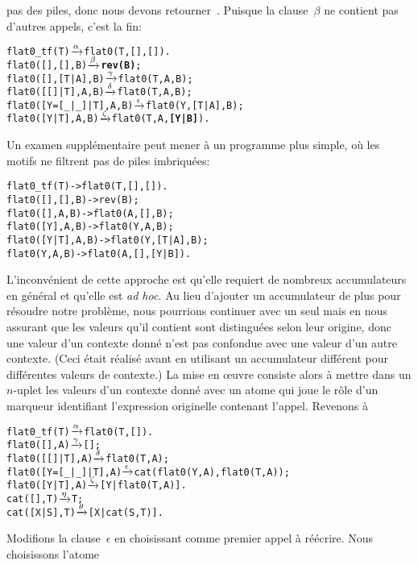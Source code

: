 pas des piles, donc nous devons retourner~. Puisque la
clause~\(\beta\) ne contient pas d'autres appels, c'est la fin:
\begin{alltt}
flat0_tf(T)                \(\smashedrightarrow{\alpha}\) flat0(T,[],[]).
flat0(         [],   [],B) \(\smashedrightarrow{\beta}\) \textbf{rev(B)};
flat0(         [],[T|A],B) \(\smashedrightarrow{\gamma}\) flat0(T,A,B);
flat0(     [[]|T],    A,B) \(\smashedrightarrow{\delta}\) flat0(T,A,B);
flat0([Y=[\_|\_]|T],    A,B) \(\smashedrightarrow{\epsilon}\) flat0(Y,[T|A],B);
flat0(      [Y|T],    A,B) \(\smashedrightarrow{\zeta}\) flat0(T,A,\textbf{[Y|B]}).
\end{alltt}
Un examen supplémentaire peut mener à un programme plus simple, où les
motifs ne filtrent pas de piles imbriquées:
\begin{alltt}
flat0_tf(T)       -> flat0(T,[],[]).
flat0(   [],[],B) -> rev(B);
flat0(   [], A,B) -> flat0(A,   [],    B);
flat0(  [Y], A,B) -> flat0(Y,    A,    B);\hfill% \emph{Optimisation}
flat0([Y|T], A,B) -> flat0(Y,[T|A],    B);
flat0(    Y, A,B) -> flat0(A,   [],[Y|B]).
\end{alltt}
L'inconvénient de cette approche est qu'elle requiert de nombreux
accumulateurs en général et qu'elle est \emph{ad hoc}. Au lieu
d'ajouter un accumulateur de plus pour résoudre notre problème, nous
pourrions continuer avec un seul mais en nous assurant que les valeurs
qu'il contient sont distinguées selon leur origine, donc une valeur
d'un contexte donné n'est pas confondue avec une valeur d'un autre
contexte. (Ceci était réalisé avant en utilisant un accumulateur
différent pour différentes valeurs de contexte.) La mise en œuvre
consiste alors à mettre dans un \(n\)-uplet les valeurs d'un contexte
donné avec un atome qui joue le rôle d'un marqueur identifiant
l'expression originelle contenant l'appel. Revenons à
\begin{alltt}
flat0\_tf(T)          \(\smashedrightarrow{\alpha}\) flat0(T,[]).
flat0(         [],A) \(\smashedrightarrow{\gamma}\) [];\hfill% A \emph{inutile pour le moment}
flat0(     [[]|T],A) \(\smashedrightarrow{\delta}\) flat0(T,A);
flat0([Y=[\_|\_]|T],A) \(\smashedrightarrow{\epsilon}\) cat(flat0(Y,A),flat0(T,A));
flat0(      [Y|T],A) \(\smashedrightarrow{\zeta}\) [Y|flat0(T,A)].
cat(   [],T)         \(\smashedrightarrow{\eta}\) T;
cat([X|S],T)         \(\smashedrightarrow{\theta}\) [X|cat(S,T)].
\end{alltt}
Modifions la clause~\(\epsilon\) en choisissant 
comme premier appel à réécrire. Nous choisissons l'atome~
